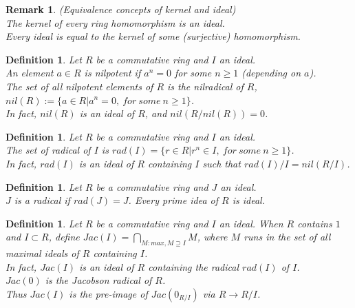 \documentclass[a4paper,sfsidenotes,openany]{tufte-book}
\theoremstyle{theorem}
\newtheorem{definition}[theorem]{Definition}
\newtheorem{remark}[theorem]{Remark}
\begin{document}
\begin{fullwidth}
\begin{remark}
\textit{{\color{blue} (Equivalence concepts of kernel and ideal)}}\\
The kernel of every ring homomorphism is an ideal.\\
Every ideal is equal to the kernel of some (surjective) homomorphism.\\
\end{remark}
\>

\begin{definition}
Let $R$ be a commutative ring and $I$ an ideal.\\
An element $a \in R$ is 	\textit{{\color{blue} nilpotent}} if $a^n = 0$ for some $n \geq 1$ (depending on $a$).\\
The set of all nilpotent elements of $R$ is the 	\textit{{\color{blue} nilradical of $R$}}, $nil(R) := \{a \in R | a^n = 0, \ for \ some \ n \geq 1 \}$.\\
In fact, $nil(R)$ is an ideal of $R$, and $nil(R/nil(R)) = 0$.\\
\end{definition}
\>

\begin{definition}
Let $R$ be a commutative ring and $I$ an ideal.\\
The set of \textit{{\color{blue} radical of $I$}} is $rad(I) = \{ r \in R | r^n \in I, \ for \ some \ n \geq 1\}$.\\
In fact, $rad(I)$ is an ideal of $R$ containing $I$ such that $rad(I)/I = nil(R/I)$.\\
\end{definition}
\>

\begin{definition}
Let $R$ be a commutative ring and $J$ an ideal.\\
$J$ is a radical if $rad(J) = J$. Every prime idea of $R$ is ideal.\\
\end{definition}
\>

\begin{definition}
Let $R$ be a commutative ring and $I$ an ideal.
When $R$ contains $1$ and $I \subset R$, define $Jac(I) = \bigcap_{M: max, M \supseteq I} M$, where $M$ runs in the set of all maximal ideals of $R$ containing $I$.\\
In fact, $Jac(I)$ is an ideal of $R$ containing the radical $rad(I)$ of $I$.\\
$Jac(0)$ is the \textit{{\color{blue} Jacobson radical of $R$}}.\\
Thus $Jac(I)$ is the pre-image of $Jac(0_{R/I})$ via $R \rightarrow R/I$.\\
\end{definition}
\>


\end{fullwidth}
\end{document}

